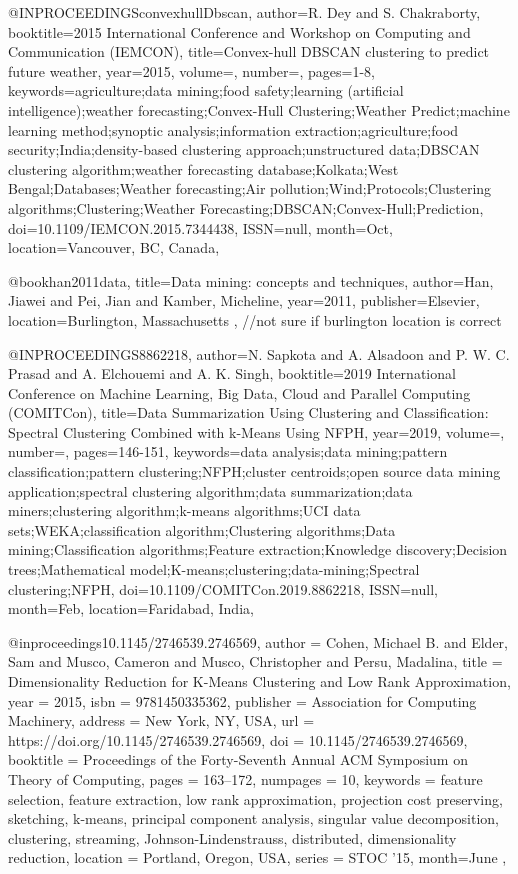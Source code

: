 @INPROCEEDINGS{convexhullDbscan, 
author={R. {Dey} and S. {Chakraborty}}, 
booktitle={2015 International Conference and Workshop on Computing and Communication (IEMCON)}, 
title={Convex-hull DBSCAN clustering to predict future weather}, 
year={2015}, 
volume={}, 
number={}, 
pages={1-8}, 
keywords={agriculture;data mining;food safety;learning (artificial intelligence);weather forecasting;Convex-Hull Clustering;Weather Predict;machine learning method;synoptic analysis;information extraction;agriculture;food security;India;density-based clustering approach;unstructured data;DBSCAN clustering algorithm;weather forecasting database;Kolkata;West Bengal;Databases;Weather forecasting;Air pollution;Wind;Protocols;Clustering algorithms;Clustering;Weather Forecasting;DBSCAN;Convex-Hull;Prediction}, 
doi={10.1109/IEMCON.2015.7344438}, 
ISSN={null}, 
month={Oct},
location={Vancouver, BC, Canada}},


@book{han2011data,
  title={Data mining: concepts and techniques},
  author={Han, Jiawei and Pei, Jian and Kamber, Micheline},
  year={2011},
  publisher={Elsevier},
  location={Burlington, Massachusetts}
},
//not sure if burlington location is correct


@INPROCEEDINGS{8862218, 
author={N. {Sapkota} and A. {Alsadoon} and P. W. C. {Prasad} and A. {Elchouemi} and A. K. {Singh}}, 
booktitle={2019 International Conference on Machine Learning, Big Data, Cloud and Parallel Computing (COMITCon)}, 
title={Data Summarization Using Clustering and Classification: Spectral Clustering Combined with k-Means Using NFPH}, 
year={2019}, 
volume={}, 
number={}, 
pages={146-151}, 
keywords={data analysis;data mining;pattern classification;pattern clustering;NFPH;cluster centroids;open source data mining application;spectral clustering algorithm;data summarization;data miners;clustering algorithm;k-means algorithms;UCI data sets;WEKA;classification algorithm;Clustering algorithms;Data mining;Classification algorithms;Feature extraction;Knowledge discovery;Decision trees;Mathematical model;K-means;clustering;data-mining;Spectral clustering;NFPH}, 
doi={10.1109/COMITCon.2019.8862218}, 
ISSN={null}, 
month={Feb},
location={Faridabad, India}},

@inproceedings{10.1145/2746539.2746569,
author = {Cohen, Michael B. and Elder, Sam and Musco, Cameron and Musco, Christopher and Persu, Madalina},
title = {Dimensionality Reduction for K-Means Clustering and Low Rank Approximation},
year = {2015},
isbn = {9781450335362},
publisher = {Association for Computing Machinery},
address = {New York, NY, USA},
url = {https://doi.org/10.1145/2746539.2746569},
doi = {10.1145/2746539.2746569},
booktitle = {Proceedings of the Forty-Seventh Annual ACM Symposium on Theory of Computing},
pages = {163–172},
numpages = {10},
keywords = {feature selection, feature extraction, low rank approximation, projection cost preserving, sketching, k-means, principal component analysis, singular value decomposition, clustering, streaming, Johnson-Lindenstrauss, distributed, dimensionality reduction},
location = {Portland, Oregon, USA},
series = {STOC ’15},
month={June}
},

